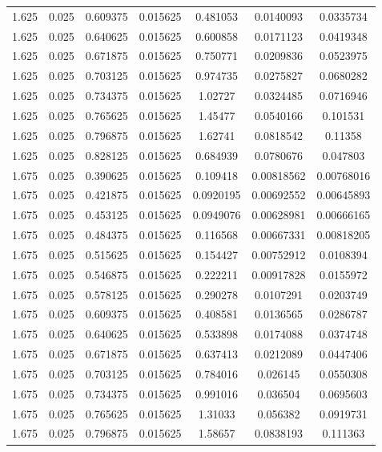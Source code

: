\begin{table}[bh]
\begin{center}
{\begin{tabular}{ccccccc}
1.625	 & 0.025 & 	0.609375	 & 0.015625	 & 0.481053	 & 0.0140093	 & 0.0335734 \\ 
1.625	 & 0.025 & 	0.640625	 & 0.015625	 & 0.600858	 & 0.0171123	 & 0.0419348 \\ 
1.625	 & 0.025 & 	0.671875	 & 0.015625	 & 0.750771	 & 0.0209836	 & 0.0523975 \\ 
1.625	 & 0.025 & 	0.703125	 & 0.015625	 & 0.974735	 & 0.0275827	 & 0.0680282 \\ 
1.625	 & 0.025 & 	0.734375	 & 0.015625	 & 1.02727	 & 0.0324485	 & 0.0716946 \\ 
1.625	 & 0.025 & 	0.765625	 & 0.015625	 & 1.45477	 & 0.0540166	 & 0.101531 \\ 
1.625	 & 0.025 & 	0.796875	 & 0.015625	 & 1.62741	 & 0.0818542	 & 0.11358 \\ 
1.625	 & 0.025 & 	0.828125	 & 0.015625	 & 0.684939	 & 0.0780676	 & 0.047803 \\ 
1.675	 & 0.025 & 	0.390625	 & 0.015625	 & 0.109418	 & 0.00818562	 & 0.00768016 \\ 
1.675	 & 0.025 & 	0.421875	 & 0.015625	 & 0.0920195	 & 0.00692552	 & 0.00645893 \\ 
1.675	 & 0.025 & 	0.453125	 & 0.015625	 & 0.0949076	 & 0.00628981	 & 0.00666165 \\ 
1.675	 & 0.025 & 	0.484375	 & 0.015625	 & 0.116568	 & 0.00667331	 & 0.00818205 \\ 
1.675	 & 0.025 & 	0.515625	 & 0.015625	 & 0.154427	 & 0.00752912	 & 0.0108394 \\ 
1.675	 & 0.025 & 	0.546875	 & 0.015625	 & 0.222211	 & 0.00917828	 & 0.0155972 \\ 
1.675	 & 0.025 & 	0.578125	 & 0.015625	 & 0.290278	 & 0.0107291	 & 0.0203749 \\ 
1.675	 & 0.025 & 	0.609375	 & 0.015625	 & 0.408581	 & 0.0136565	 & 0.0286787 \\ 
1.675	 & 0.025 & 	0.640625	 & 0.015625	 & 0.533898	 & 0.0174088	 & 0.0374748 \\ 
1.675	 & 0.025 & 	0.671875	 & 0.015625	 & 0.637413	 & 0.0212089	 & 0.0447406 \\ 
1.675	 & 0.025 & 	0.703125	 & 0.015625	 & 0.784016	 & 0.026145	 & 0.0550308 \\ 
1.675	 & 0.025 & 	0.734375	 & 0.015625	 & 0.991016	 & 0.036504	 & 0.0695603 \\ 
1.675	 & 0.025 & 	0.765625	 & 0.015625	 & 1.31033	 & 0.056382	 & 0.0919731 \\ 
1.675	 & 0.025 & 	0.796875	 & 0.015625	 & 1.58657	 & 0.0838193	 & 0.111363 \\ 

\end{tabular}}
\end{center}
\end{table}
